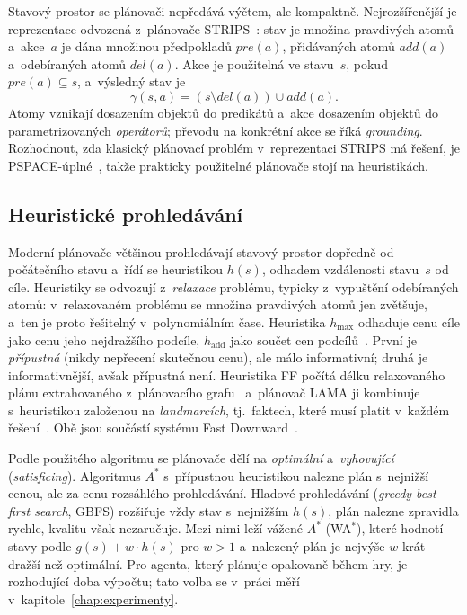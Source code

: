Stavový prostor se plánovači nepředává výčtem, ale kompaktně. Nejrozšířenější je reprezentace odvozená z~plánovače STRIPS~\cite{Fikes1971}: stav je množina pravdivých atomů a~akce~$a$ je dána množinou předpokladů $\mathit{pre}(a)$, přidávaných atomů $\mathit{add}(a)$ a~odebíraných atomů $\mathit{del}(a)$. Akce je použitelná ve stavu~$s$, pokud $\mathit{pre}(a) \subseteq s$, a~výsledný stav je
\[
	\gamma(s, a) = (s \setminus \mathit{del}(a)) \cup \mathit{add}(a).
\]
Atomy vznikají dosazením objektů do predikátů a~akce dosazením objektů do parametrizovaných \emph{operátorů}; převodu na konkrétní akce se říká \emph{grounding}. Rozhodnout, zda klasický plánovací problém v~reprezentaci STRIPS má řešení, je PSPACE-úplné~\cite{Ghallab2004}, takže prakticky použitelné plánovače stojí na heuristikách.

\subsection{Heuristické prohledávání}

Moderní plánovače většinou prohledávají stavový prostor dopředně od počátečního stavu a~řídí se heuristikou $h(s)$, odhadem vzdálenosti stavu~$s$ od cíle. Heuristiky se odvozují z~\emph{relaxace} problému, typicky z~vypuštění odebíraných atomů: v~relaxovaném problému se množina pravdivých atomů jen zvětšuje, a~ten je proto řešitelný v~polynomiálním čase. Heuristika $h_{\max}$ odhaduje cenu cíle jako cenu jeho nejdražšího podcíle, $h_{\mathrm{add}}$ jako součet cen podcílů~\cite{BonetGeffner2001}. První je \emph{přípustná} (nikdy nepřecení skutečnou cenu), ale málo informativní; druhá je informativnější, avšak přípustná není. Heuristika FF počítá délku relaxovaného plánu extrahovaného z~plánovacího grafu~\cite{Hoffmann2001,Blum1997} a~plánovač LAMA ji kombinuje s~heuristikou založenou na \emph{landmarcích}, tj.~faktech, které musí platit v~každém řešení~\cite{Richter2010}. Obě jsou součástí systému Fast Downward~\cite{Helmert2006}.

Podle použitého algoritmu se plánovače dělí na \emph{optimální} a~\emph{vyhovující} (\emph{satisficing}). Algoritmus $A^*$ s~přípustnou heuristikou nalezne plán s~nejnižší cenou, ale za cenu rozsáhlého prohledávání. Hladové prohledávání (\emph{greedy best-first search}, GBFS) rozšiřuje vždy stav s~nejnižším $h(s)$, plán nalezne zpravidla rychle, kvalitu však nezaručuje. Mezi nimi leží vážené $A^*$ (WA$^*$), které hodnotí stavy podle $g(s) + w \cdot h(s)$ pro $w > 1$ a~nalezený plán je nejvýše $w$-krát dražší než optimální. Pro agenta, který plánuje opakovaně během hry, je rozhodující doba výpočtu; tato volba se v~práci měří v~kapitole~\ref{chap:experimenty}.

